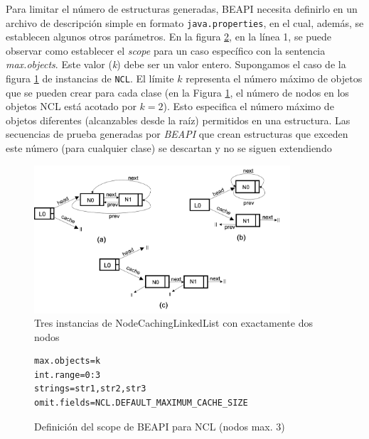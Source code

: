 Para limitar el número de estructuras generadas, BEAPI necesita definirlo en un archivo de descripción simple en formato \texttt{java.properties}, 
en el cual, además, se establecen algunos otros parámetros. En la figura \ref{fig:NCL-fin-BEAPI}, en la línea 1, se puede observar como establecer 
el \emph{scope} para un caso específico con la sentencia \emph{max.objects}. Este valor (\emph{k}) debe ser un valor entero. Supongamos el caso de 
la figura \ref{fig:ncl-instances} de instancias de \texttt{NCL}.  El límite $k$ representa el número máximo de objetos que se pueden crear para cada 
clase (en la Figura \ref{fig:ncl-instances}, el número de nodos en los objetos NCL está acotado por $k=2$). Esto especifica el número máximo de objetos 
diferentes (alcanzables desde la raíz) permitidos en una estructura. Las secuencias de prueba generadas por \emph{BEAPI} que crean estructuras que 
exceden este número (para cualquier clase) se descartan y no se siguen extendiendo

\begin{figure}[H]
    \centering
    \includegraphics[width=0.85\textwidth]{images/NCL-instances.png}
    \caption{Tres instancias de NodeCachingLinkedList con exactamente dos nodos}
    \label{fig:ncl-instances}
\end{figure}

\begin{figure}[H]
\begin{lstlisting}[keywordstyle=\scriptsize\ttfamily]
max.objects=k
int.range=0:3
strings=str1,str2,str3
omit.fields=NCL.DEFAULT_MAXIMUM_CACHE_SIZE
\end{lstlisting}
\caption{Definición del scope de BEAPI para NCL (nodos max. 3)}
\label{fig:NCL-fin-BEAPI}
\end{figure}



